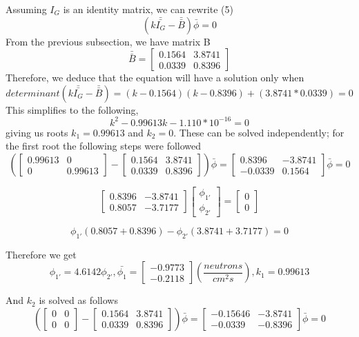 \documentclass[11pt, oneside]{article}   	%
\begin{document}
Assuming $I_{G}$ is an identity matrix, we can rewrite (5)
$$(k\bar{\bar{I_{G}}} - \bar{\bar{B}})\bar{\phi } = 0$$
From the previous subsection, we have matrix B
$$\bar{\bar{B}} =  \begin{bmatrix}
0.1564&3.8741 \\ 
0.0339 & 0.8396
\end{bmatrix}$$
Therefore, we deduce that the equation will have a solution only when 
$$ determinant(k\bar{\bar{I_{G}}} - \bar{\bar{B}}) = (k-0.1564)(k-0.8396) + (3.8741*0.0339) = 0 $$
This simplifies to the following, 
$$k^{2} - 0.99613k - 1.110*10^{-16}= 0$$
giving us roots $k_1 = 0.99613$ and $k_2 = 0$. These can be solved independently; for the first root the following steps were followed
$$( \begin{bmatrix}
 0.99613&0 \\ 
0 &  0.99613
\end{bmatrix}-\begin{bmatrix}
0.1564&3.8741 \\ 
0.0339 & 0.8396
\end{bmatrix} ) \bar{\phi } = \begin{bmatrix}
0.8396&-3.8741 \\ 
-0.0339 & 0.1564
\end{bmatrix} \bar{\phi } = 0$$

$$\begin{bmatrix}
0.8396&-3.8741 \\ 
0.8057 & -3.7177
\end{bmatrix} \begin{bmatrix}
\phi _{1'}\\ 
\phi _{2'}
\end{bmatrix}= \begin{bmatrix}
0\\ 
0
\end{bmatrix}$$

$$\phi _{1'}(0.8057+0.8396)-\phi _{2'}(3.8741+3.7177) = 0$$

Therefore we get
\begin{equation}
\phi _{1'}=4.6142\phi_{2'}, \bar{\phi _{1}} = \begin{bmatrix}
-0.9773\\ 
-0.2118
\end{bmatrix}(\frac{neutrons}{cm^{2}s}), k_{1} = 0.99613 \end{equation}

And $k_2$ is solved as follows
$$( \begin{bmatrix}
 0&0 \\ 
0 &  0
\end{bmatrix}-\begin{bmatrix}
0.1564&3.8741 \\ 
0.0339 & 0.8396
\end{bmatrix} ) \bar{\phi } = \begin{bmatrix}
-0.15646&-3.8741 \\ 
-0.0339 & -0.8396
\end{bmatrix} \bar{\phi } = 0$$
\end{document}

